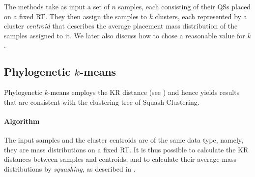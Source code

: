 The methods take as input a set of $n$ samples, each consisting of their \acfp{QS} placed on a fixed \acf{RT}.
They then assign the samples to $k$ clusters, each represented by a cluster \emph{centroid}
that describes the average placement mass distribution of the samples assigned to it.
We later also discuss how to chose a reasonable value for $k$.


\subsection{Phylogenetic \texorpdfstring{$k$-means}{k-means}}
\label{ch:Clustering:sec:Methods:sub:PhylogeneticKmeans}

Phylogenetic $k$-means employs the KR distance (see )
and hence yields results that are consistent with the clustering tree of Squash Clustering.


\paragraph{Algorithm}
\label{ch:Clustering:sec:Methods:sub:PhylogeneticKmeans:par:Algorithm}


The input samples and the cluster centroids are of the same data type,
namely, they are mass distributions on a fixed \ac{RT}.
It is thus possible to calculate the KR distances between samples and centroids,
and to calculate their average mass distributions by \emph{squashing},
as described in .

